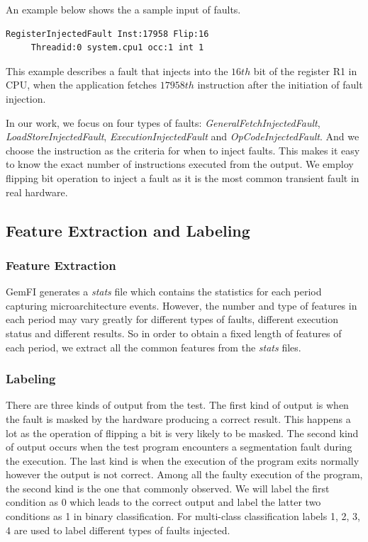 An example below shows the a sample input of faults. 
\begin{lstlisting}	
RegisterInjectedFault Inst:17958 Flip:16 
     Threadid:0 system.cpu1 occ:1 int 1
\end{lstlisting}

This example describes a fault that injects into the $16th$ bit of the register R1 in CPU, when the application fetches $17958th$ instruction after the initiation of fault injection. 

In our work, we focus on four types of faults: \textit{GeneralFetchInjectedFault}, \textit{LoadStoreInjectedFault}, \textit{ExecutionInjectedFault} and \textit{OpCodeInjectedFault}. And we choose the instruction as the criteria for when to inject faults. This makes it easy to know the exact number of instructions executed from the output. We employ flipping bit operation to inject a fault as it is the most common transient fault in real hardware. 



\subsection{Feature Extraction and Labeling}\label{section:FE}
\subsubsection{Feature Extraction}
GemFI generates a \emph{stats} file which contains the statistics for each period capturing microarchitecture events. However, the number and type of features in each period may vary greatly for different types of faults, different execution status and different results. So in order to obtain a fixed length of features of each period, we extract all the common features from the \emph{stats} files. 
\subsubsection{Labeling}
There are three kinds of output from the test. The first kind of output is when the fault is masked by the hardware producing a correct result. This happens a lot as the operation of flipping a bit is very likely to be masked. The second kind of output occurs when the test program encounters a segmentation fault during the execution. The last kind is when the execution of the program exits normally however the output is not correct. Among all the faulty execution of the program, the second kind is the one that commonly observed. We will label the first condition as 0 which leads to the correct output and label the latter two conditions as 1 in binary classification. For multi-class classification labels 1, 2, 3, 4 are used to label different types of faults injected.


